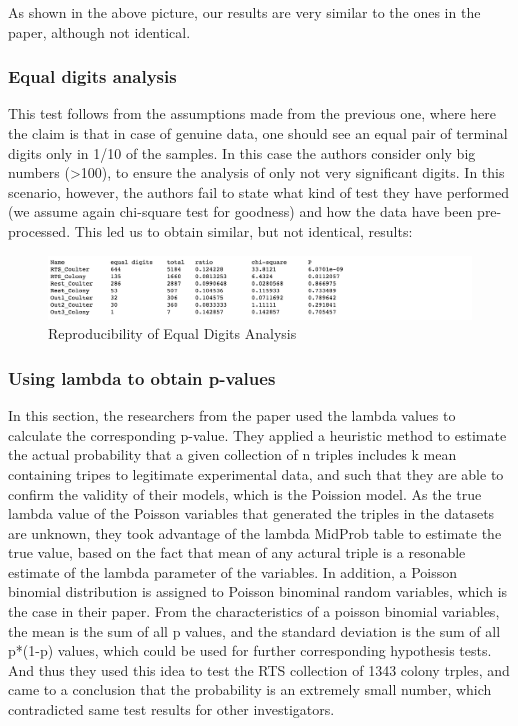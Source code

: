 \documentclass{article}
\begin{document}
As shown in the above picture, our results are very similar to the ones
in the paper, although not identical.

\subsubsection{Equal digits analysis}\label{equal-digits-analysis}

This test follows from the assumptions made from the previous one, where
here the claim is that in case of genuine data, one should see an equal
pair of terminal digits only in 1/10 of the samples. In this case the
authors consider only big numbers (\textgreater{}100), to ensure the
analysis of only not very significant digits. In this scenario, however,
the authors fail to state what kind of test they have performed (we
assume again chi-square test for goodness) and how the data have been
pre-processed. This led us to obtain similar, but not identical,
results:

\begin{figure}[htbp]
\centering
\includegraphics{images/eq_repr.png}
\caption{Reproducibility of Equal Digits Analysis}
\end{figure}

    \subsubsection{Using lambda to obtain
p-values}\label{using-lambda-to-obtain-p-values}

In this section, the researchers from the paper used the lambda values
to calculate the corresponding p-value. They applied a heuristic method
to estimate the actual probability that a given collection of n triples
includes k mean containing tripes to legitimate experimental data, and
such that they are able to confirm the validity of their models, which
is the Poission model. As the true lambda value of the Poisson variables
that generated the triples in the datasets are unknown, they took
advantage of the lambda MidProb table to estimate the true value, based
on the fact that mean of any actural triple is a resonable estimate of
the lambda parameter of the variables. In addition, a Poisson binomial
distribution is assigned to Poisson binominal random variables, which is
the case in their paper. From the characteristics of a poisson binomial
variables, the mean is the sum of all p values, and the standard
deviation is the sum of all p*(1-p) values, which could be used for
further corresponding hypothesis tests. And thus they used this idea to
test the RTS collection of 1343 colony trples, and came to a conclusion
that the probability is an extremely small number, which contradicted
same test results for other investigators.
\end{document}
